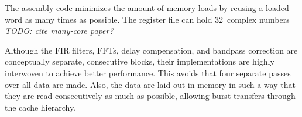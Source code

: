 \documentclass{sig-alternate}
\begin{document}
The assembly code minimizes the amount of memory loads by reusing a loaded
word as many times as possible.
The register file can hold 32~complex numbers \emph{TODO: cite many-core paper?}

Although the FIR filters, FFTs, delay compensation, and bandpass correction
are conceptually separate, consecutive blocks, their implementations are
highly interwoven to achieve better performance.
This avoids that four separate passes over all data are made.
Also, the data are laid out in memory in such a way that they are read
consecutively as much as possible, allowing burst transfers through the
cache hierarchy.








\end{document}

